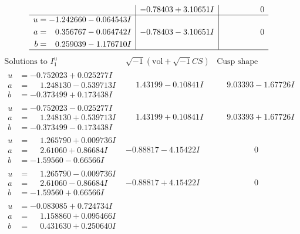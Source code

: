 \documentclass[1p]{elsarticle_modified}
\theoremstyle{definition}
\newcommand{\I}{\sqrt{-1}}
\begin{document}
$$\begin{array}{c|c|c}
 & -0.78403 + 3.10651 I & \phantom{-0.000000 } 0 \\ \hline\begin{aligned}
u &= -1.242660 - 0.064543 I \\
a &= \phantom{-}0.356767 - 0.064742 I \\
b &= \phantom{-}0.259039 - 1.176710 I\end{aligned}
 & -0.78403 - 3.10651 I & \phantom{-0.000000 } 0\\
 \hline 
 \end{array}$$\newpage$$\begin{array}{c|c|c}  
\text{Solutions to }I^u_{1}& \I (\text{vol} + \sqrt{-1}CS) & \text{Cusp shape}\\
 \hline 
\begin{aligned}
u &= -0.752023 + 0.025277 I \\
a &= \phantom{-}1.248130 - 0.539713 I \\
b &= -0.373499 + 0.173438 I\end{aligned}
 & \phantom{-}1.43199 - 0.10841 I & \phantom{-}9.03393 - 1.67726 I \\ \hline\begin{aligned}
u &= -0.752023 - 0.025277 I \\
a &= \phantom{-}1.248130 + 0.539713 I \\
b &= -0.373499 - 0.173438 I\end{aligned}
 & \phantom{-}1.43199 + 0.10841 I & \phantom{-}9.03393 + 1.67726 I \\ \hline\begin{aligned}
u &= \phantom{-}1.265790 + 0.009736 I \\
a &= \phantom{-}2.61060 + 0.86684 I \\
b &= -1.59560 - 0.66566 I\end{aligned}
 & -0.88817 - 4.15422 I & \phantom{-0.000000 } 0 \\ \hline\begin{aligned}
u &= \phantom{-}1.265790 - 0.009736 I \\
a &= \phantom{-}2.61060 - 0.86684 I \\
b &= -1.59560 + 0.66566 I\end{aligned}
 & -0.88817 + 4.15422 I & \phantom{-0.000000 } 0 \\ \hline\begin{aligned}
u &= -0.083085 + 0.724734 I \\
a &= \phantom{-}1.158860 + 0.095466 I \\
b &= \phantom{-}0.431630 + 0.250640 I\end{aligned}

\end{array}$$
\end{document}
